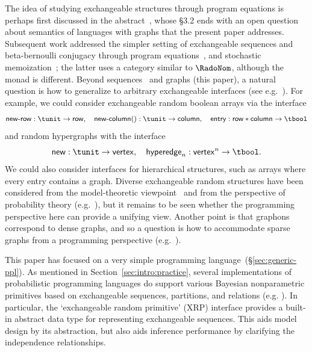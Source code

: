 The idea of studying exchangeable structures through program equations is perhaps first discussed in the abstract~\cite{XRPDA-PPS2017}, whose \S3.2 ends with an open question about semantics of languages with graphs that the present paper addresses.
Subsequent work addressed the simpler setting of exchangeable sequences and beta-bernoulli conjugacy through program equations~\cite{Staton-BB18-short},
and stochastic memoization~\cite{kaddar-staton-stoch-mem}; the latter uses a category similar to $\RadoNom$, although the monad is different. %
Beyond sequences~\cite{Staton-BB18-short} and graphs (this paper), a natural question is how to generalize to arbitrary exchangeable interfaces (see e.g.~\cite{6847223}). 
For example, we could consider exchangeable random boolean arrays via the interface
\[
  \mathsf{new\text-row}:\tunit\to\mathsf{row},\quad\mathsf{new\text-column()}:\tunit\to\mathsf{column},\quad
  \mathsf{entry}:\mathsf{row}*\mathsf{column}\to \tbool
\]
and random hypergraphs with the interface 
\[
  \mathsf{new}:\tunit \to \mathsf{vertex},\quad
  \mathsf{hyperedge}_n:\mathsf{vertex}^n\to \tbool\text.
\]
We could also consider interfaces for hierarchical structures, such as arrays where every entry contains a graph. Diverse exchangeable random structures have been considered from the model-theoretic viewpoint~\cite{ackerman-autm-invariant,crane-towsner} and from the perspective of probability theory (e.g.~\cite{kallenberg-2010,Campbell23,jlsy-dags}), but it remains to be seen whether the programming perspective here can provide a unifying view. Another point is that graphons correspond to dense graphs, and so a question is how to accommodate sparse graphs from a programming perspective (e.g.~\cite{10.1111/rssb.12233,10.1214/18-AOS1778}). 

This paper has focused on a very simple programming language~(\S\ref{sec:generic-ppl}).
As mentioned in Section~\ref{sec:intro:practice},
several implementations of probabilistic programming languages do support various Bayesian nonparametric primitives based on exchangeable sequences, partitions, and relations
(e.g. \cite{wood-aistats-2014,goodman2008church,roy2008stochastic,ks-prob-first-class-store,lazyppl,msp-venture}).
In particular, the `exchangeable random primitive' (XRP) interface
\cite{XRP-PPS2016,wu-church} 
provides a built-in abstract data type for representing exchangeable sequences.
This aids model design by its abstraction, but also aids inference performance by clarifying the independence relationships. 

